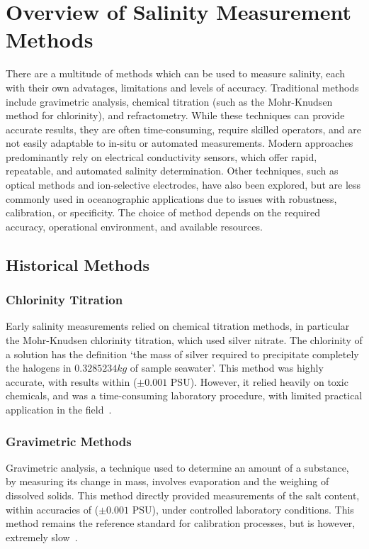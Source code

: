 \section{Overview of Salinity Measurement Methods}
There are a multitude of methods which can be used to measure salinity, each with their own advatages, limitations and levels of accuracy.
Traditional methods include gravimetric analysis, chemical titration (such as the Mohr-Knudsen method for chlorinity), and refractometry. While these techniques can provide accurate results, they are often time-consuming, require skilled operators, and are not easily adaptable to in-situ or automated measurements.
Modern approaches predominantly rely on electrical conductivity sensors, which offer rapid, repeatable, and automated salinity determination.
Other techniques, such as optical methods and ion-selective electrodes, have also been explored, but are less commonly used in oceanographic applications due to issues with robustness, calibration, or specificity.
The choice of method depends on the required accuracy, operational environment, and available resources.


\subsection{Historical Methods}
\subsubsection{Chlorinity Titration}
Early salinity measurements relied on chemical titration methods, in particular the Mohr-Knudsen chlorinity titration, which used silver nitrate.
The chlorinity of a solution has the definition `the mass of silver required to precipitate completely the halogens in $0.3 285 234 kg$ of sample seawater'.
This method was highly accurate, with results within ($\pm0.001$ PSU). However, it relied heavily on toxic chemicals, and was a time-consuming laboratory procedure, with limited practical application in the field~\cite{lewis_pss78}.

\subsubsection{Gravimetric Methods}
Gravimetric analysis, a technique used to determine an amount of a substance, by measuring its change in mass, involves evaporation and the weighing of dissolved solids.
This method directly provided measurements of the salt content, within accuracies of ($\pm0.001$ PSU), under controlled laboratory conditions.
This method remains the reference standard for calibration processes, but is however, extremely slow~\cite{chemical_ocean}.

